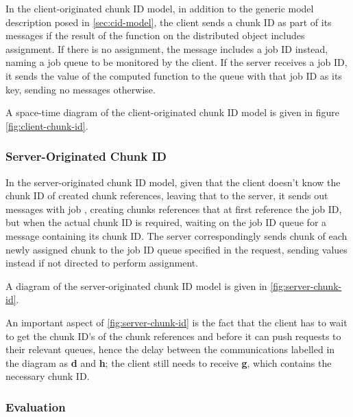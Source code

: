 In the client-originated chunk ID  model, in addition to the generic model
description posed in \cref{sec:cid-model}, the client sends a chunk ID
as part of its messages if the result of the function on the distributed object
includes assignment.
If there is no assignment, the message includes a job ID instead, naming a job
queue to be monitored by the client.
If the server receives a job ID, it sends the value of the computed function to
the queue with that job ID as its key, sending no messages otherwise.

A space-time diagram of the client-originated chunk ID model is given in figure
\cref{fig:client-chunk-id}.


\subsubsection{Server-Originated Chunk ID}

In the server-originated chunk ID model, given that the client doesn't know the
chunk ID of created chunk references, leaving that to the server, it sends out
messages with job , creating chunks references that at first reference the
job ID, but when the actual chunk ID is required, waiting on the job ID queue
for a message containing its chunk ID.
The server correspondingly sends chunk  of each newly assigned chunk to the
job ID queue specified in the request, sending values instead if not directed
to perform assignment.

A diagram of the server-originated chunk ID model is given in \cref{fig:server-chunk-id}.


An important aspect of \cref{fig:server-chunk-id} is the fact that the client has to
wait to get the chunk ID's of the chunk references  and 
before it can push requests to their relevant queues, hence the delay between
the communications labelled in the diagram as \textcolor{dark2-3}{\textbf{d}}
and \textcolor{dark2-3}{\textbf{h}}; the client still needs to receive
\textcolor{dark2-1}{\textbf{g}}, which contains the necessary chunk ID.

\subsubsection{Evaluation}\label{sec:mod-eval}

